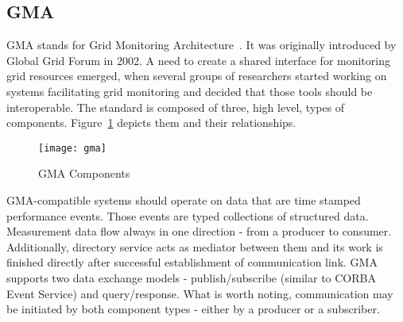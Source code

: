 \subsection{GMA}

\label{ssec:gma}

GMA stands for Grid Monitoring Architecture~\cite{GMA1,GMA2}. It was originally introduced by Global Grid Forum in 2002. A need to create a shared interface for monitoring grid resources emerged, when several groups of researchers started working on systems facilitating grid monitoring and decided that those tools should be interoperable. The standard is composed of three, high level, types of components. Figure~\ref{fig:gma} depicts them and their relationships.

\begin{figure}[ht]

\centering

\texttt{[image: gma]} \caption{GMA Components} \label{fig:gma}

\end{figure}

GMA-compatible systems should operate on data that are time stamped performance events. Those events are typed collections of structured data. Measurement data flow always in one direction - from a producer to consumer. Additionally, directory service acts as mediator between them and its work is finished directly after successful establishment of communication link. GMA supports two data exchange models - publish/subscribe (similar to CORBA Event Service) and query/response. What is worth noting, communication may be initiated by both component types - either by a producer or a subscriber.